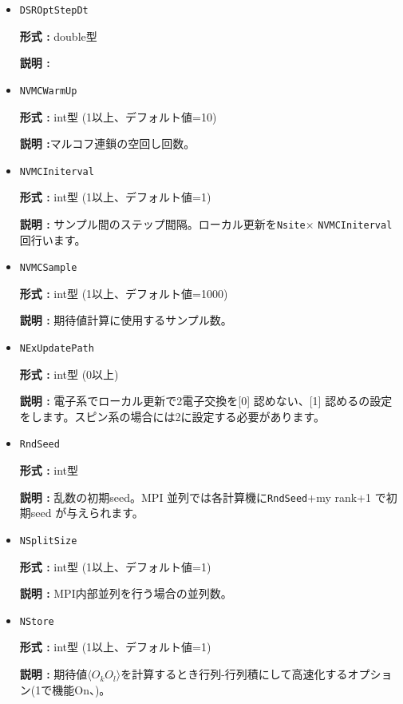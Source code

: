 \begin{itemize}
 {\bf 形式 :} double型 (デフォルト値 = 0.02)

  {\bf 説明 :} SR 法安定化因子。手法論文\cite{Tahara2008}の$\varepsilon$に対応。
     
\item \verb|DSROptStepDt|

{\bf 形式 :} double型 

{\bf 説明 :} 
 
\item \verb|NVMCWarmUp|

{\bf 形式 :} int型 (1以上、デフォルト値=10)

{\bf 説明 :}マルコフ連鎖の空回し回数。

\item \verb|NVMCIniterval|

{\bf 形式 :} int型 (1以上、デフォルト値=1)

{\bf 説明 :} サンプル間のステップ間隔。ローカル更新を\verb|Nsite|× \verb|NVMCIniterval| 回行います。

\item \verb|NVMCSample|

{\bf 形式 :} int型 (1以上、デフォルト値=1000)

{\bf 説明 :} 期待値計算に使用するサンプル数。

\item \verb|NExUpdatePath|

{\bf 形式 :} int型 (0以上)

{\bf 説明 :} 電子系でローカル更新で2電子交換を[0] 認めない、[1] 認めるの設定をします。スピン系の場合には2に設定する必要があります。

\item \verb|RndSeed|

{\bf 形式 :} int型 

{\bf 説明 :} 乱数の初期seed。MPI 並列では各計算機に\verb|RndSeed|+my rank+1 で初期seed が与えられます。

 \item \verb|NSplitSize|

{\bf 形式 :} int型 (1以上、デフォルト値=1)

{\bf 説明 :} MPI内部並列を行う場合の並列数。

\item \verb|NStore|

{\bf 形式 :} int型 (1以上、デフォルト値=1)

{\bf 説明 :} 期待値$\langle O_k O_l \rangle$を計算するとき行列-行列積にして高速化するオプション(1で機能On、)。
 
 \end{itemize}


